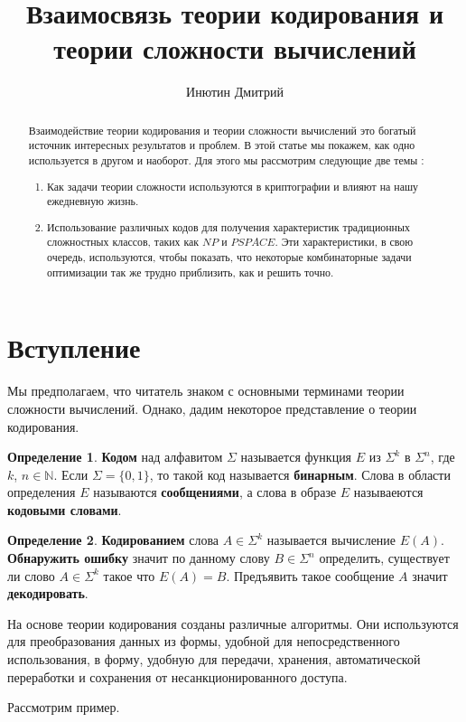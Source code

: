 \documentclass{article}
\title{Взаимосвязь теории кодирования и теории сложности вычислений}
\date{}
\author{Инютин Дмитрий}
\newcommand{\blank} {
\newline
\newline
}
\theoremstyle{definition}
\newtheorem{definition}{Определение}[section]
\begin{document}
\maketitle

\begin{abstract}
\noindent Взаимодействие теории кодирования и теории сложности вычислений это богатый источник интересных результатов и проблем. В этой статье мы покажем, как одно используется в другом и наоборот. Для этого мы рассмотрим следующие две темы :
\begin{enumerate}
\item Как задачи теории сложности используются в криптографии и влияют на нашу ежедневную жизнь.
\item Использование различных кодов для получения характеристик традиционных сложностных классов, таких как $NP$ и $PSPACE$. Эти характеристики, в свою очередь, используются, чтобы показать, что некоторые комбинаторные задачи оптимизации так же трудно приблизить, как и решить точно.
\end{enumerate}
\end{abstract}

\section{Вступление}
Мы предполагаем, что читатель знаком с основными терминами теории сложности вычислений. Однако, дадим некоторое представление о теории кодирования.

\theoremstyle{definition}
\begin{definition}{}
\textbf{Кодом} над алфавитом $\Sigma$ называется функция $E$ из $\Sigma^k$ в $\Sigma^n$, где $k$, $n \in \mathbb{N}$. Если $\Sigma = \{0,1\}$, то такой код называется \textbf{бинарным}. Слова в области определения $E$ называются \textbf{сообщениями}, а слова в образе $E$ называеются \textbf{кодовыми словами}.
\end{definition}

\theoremstyle{definition}
\begin{definition}{}
\textbf{Кодированием} слова $A \in \Sigma^k$ называется вычисление $E(A)$. \textbf{Обнаружить ошибку} значит по данному слову $B \in \Sigma^n$ определить, существует ли слово $A \in \Sigma^k$ такое что $E(A) = B$. Предъявить такое сообщение $A$ значит \textbf{декодировать}.
\end{definition}

\noindent На основе теории кодирования созданы различные алгоритмы. Они используются для преобразования данных из формы, удобной для непосредственного использования, в форму, удобную для передачи, хранения, автоматической переработки и сохранения от несанкционированного доступа.
\blank
Рассмотрим пример.
\end{document}
